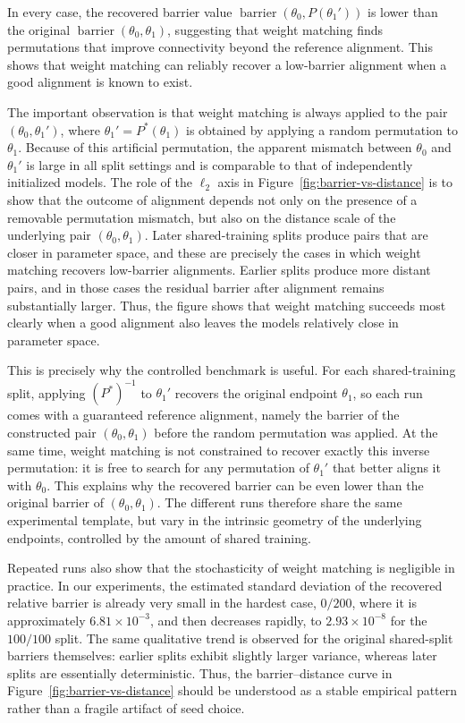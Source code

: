 \documentclass[11pt,a4paper]{report}
\begin{document}
In every case, the recovered barrier value \(\operatorname{barrier}(\theta_0, P(\theta_1'))\) is lower than the original \(\operatorname{barrier}(\theta_0, \theta_1)\), suggesting that weight matching finds permutations that improve connectivity beyond the reference alignment. This shows that weight matching can reliably recover a low-barrier alignment when a good alignment is known to exist.

The important observation is that weight matching is always applied to the pair $(\theta_0,\theta_1')$, where $\theta_1' = P^\ast(\theta_1)$ is obtained by applying a random permutation to $\theta_1$. Because of this artificial permutation, the apparent mismatch between $\theta_0$ and $\theta_1'$ is large in all split settings and is comparable to that of independently initialized models. The role of the $\ell_2$ axis in Figure~\ref{fig:barrier-vs-distance} is to show that the outcome of alignment depends not only on the presence of a removable permutation mismatch, but also on the distance scale of the underlying pair $(\theta_0,\theta_1)$. Later shared-training splits produce pairs that are closer in parameter space, and these are precisely the cases in which weight matching recovers low-barrier alignments. Earlier splits produce more distant pairs, and in those cases the residual barrier after alignment remains substantially larger. Thus, the figure shows that weight matching succeeds most clearly when a good alignment also leaves the models relatively close in parameter space.

This is precisely why the controlled benchmark is useful. For each shared-training split, applying $(P^\ast)^{-1}$ to $\theta_1'$ recovers the original endpoint $\theta_1$, so each run comes with a guaranteed reference alignment, namely the barrier of the constructed pair $(\theta_0,\theta_1)$ before the random permutation was applied. At the same time, weight matching is not constrained to recover exactly this inverse permutation: it is free to search for any permutation of $\theta_1'$ that better aligns it with $\theta_0$. This explains why the recovered barrier can be even lower than the original barrier of $(\theta_0,\theta_1)$. The different runs therefore share the same experimental template, but vary in the intrinsic geometry of the underlying endpoints, controlled by the amount of shared training.

Repeated runs also show that the stochasticity of weight matching is negligible in practice. In our experiments, the estimated standard deviation of the recovered relative barrier is already very small in the hardest case, $0/200$, where it is approximately \(6.81\times 10^{-3}\), and then decreases rapidly, to \(2.93\times 10^{-8}\) for the \(100/100\) split. The same qualitative trend is observed for the original shared-split barriers themselves: earlier splits exhibit slightly larger variance, whereas later splits are essentially deterministic. Thus, the barrier--distance curve in Figure~\ref{fig:barrier-vs-distance} should be understood as a stable empirical pattern rather than a fragile artifact of seed choice.
\end{document}
